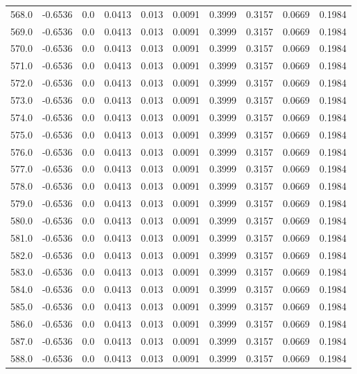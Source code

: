 \begin{longtable}{lrrrrrrrrr}
568.0 & -0.6536 & 0.0 & 0.0413 & 0.013 & 0.0091 & 0.3999 & 0.3157 & 0.0669 & 0.1984 \\
569.0 & -0.6536 & 0.0 & 0.0413 & 0.013 & 0.0091 & 0.3999 & 0.3157 & 0.0669 & 0.1984 \\
570.0 & -0.6536 & 0.0 & 0.0413 & 0.013 & 0.0091 & 0.3999 & 0.3157 & 0.0669 & 0.1984 \\
571.0 & -0.6536 & 0.0 & 0.0413 & 0.013 & 0.0091 & 0.3999 & 0.3157 & 0.0669 & 0.1984 \\
572.0 & -0.6536 & 0.0 & 0.0413 & 0.013 & 0.0091 & 0.3999 & 0.3157 & 0.0669 & 0.1984 \\
573.0 & -0.6536 & 0.0 & 0.0413 & 0.013 & 0.0091 & 0.3999 & 0.3157 & 0.0669 & 0.1984 \\
574.0 & -0.6536 & 0.0 & 0.0413 & 0.013 & 0.0091 & 0.3999 & 0.3157 & 0.0669 & 0.1984 \\
575.0 & -0.6536 & 0.0 & 0.0413 & 0.013 & 0.0091 & 0.3999 & 0.3157 & 0.0669 & 0.1984 \\
576.0 & -0.6536 & 0.0 & 0.0413 & 0.013 & 0.0091 & 0.3999 & 0.3157 & 0.0669 & 0.1984 \\
577.0 & -0.6536 & 0.0 & 0.0413 & 0.013 & 0.0091 & 0.3999 & 0.3157 & 0.0669 & 0.1984 \\
578.0 & -0.6536 & 0.0 & 0.0413 & 0.013 & 0.0091 & 0.3999 & 0.3157 & 0.0669 & 0.1984 \\
579.0 & -0.6536 & 0.0 & 0.0413 & 0.013 & 0.0091 & 0.3999 & 0.3157 & 0.0669 & 0.1984 \\
580.0 & -0.6536 & 0.0 & 0.0413 & 0.013 & 0.0091 & 0.3999 & 0.3157 & 0.0669 & 0.1984 \\
581.0 & -0.6536 & 0.0 & 0.0413 & 0.013 & 0.0091 & 0.3999 & 0.3157 & 0.0669 & 0.1984 \\
582.0 & -0.6536 & 0.0 & 0.0413 & 0.013 & 0.0091 & 0.3999 & 0.3157 & 0.0669 & 0.1984 \\
583.0 & -0.6536 & 0.0 & 0.0413 & 0.013 & 0.0091 & 0.3999 & 0.3157 & 0.0669 & 0.1984 \\
584.0 & -0.6536 & 0.0 & 0.0413 & 0.013 & 0.0091 & 0.3999 & 0.3157 & 0.0669 & 0.1984 \\
585.0 & -0.6536 & 0.0 & 0.0413 & 0.013 & 0.0091 & 0.3999 & 0.3157 & 0.0669 & 0.1984 \\
586.0 & -0.6536 & 0.0 & 0.0413 & 0.013 & 0.0091 & 0.3999 & 0.3157 & 0.0669 & 0.1984 \\
587.0 & -0.6536 & 0.0 & 0.0413 & 0.013 & 0.0091 & 0.3999 & 0.3157 & 0.0669 & 0.1984 \\
588.0 & -0.6536 & 0.0 & 0.0413 & 0.013 & 0.0091 & 0.3999 & 0.3157 & 0.0669 & 0.1984 \\

\end{longtable}
